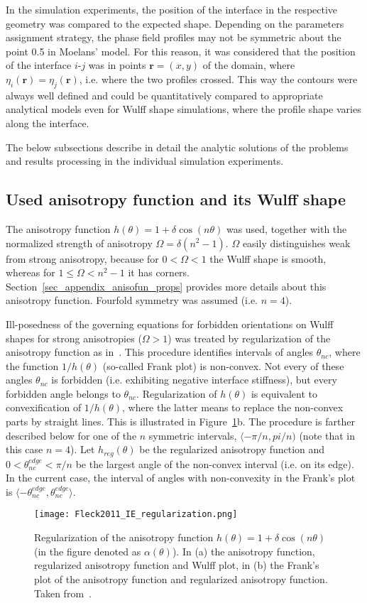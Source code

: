 In the simulation experiments, the position of the interface in the respective geometry was compared to the expected shape. Depending on the parameters assignment strategy, the phase field profiles may not be symmetric about the point 0.5 in Moelans' model. For this reason, it was considered that the position of the interface $i$-$j$ was in points $\bm{r}=(x,y)$ of the domain, where $\eta_i(\bm{r})=\eta_j(\bm{r})$, i.e. where the two profiles crossed. This way the contours were always well defined and could be quantitatively compared to appropriate analytical models even for Wulff shape simulations, where the profile shape varies along the interface.

The below subsections describe in detail the analytic solutions of the problems and results processing in the individual simulation experiments. 

\subsection{Used anisotropy function and its Wulff shape}
The anisotropy function $h(\theta)=1+\delta\cos(n\theta)$ was used, together with the normalized strength of anisotropy $\Omega=\delta(n^2-1)$. $\Omega$ easily distinguishes weak from strong anisotropy, because for $0<\Omega<1$ the Wulff shape is smooth, whereas for $1\leq\Omega<n^2-1$ it has corners. Section~\ref{sec_appendix_anisofun_props} provides more details about this anisotropy function. Fourfold symmetry was assumed (i.e. $n=4$).

Ill-posedness of the governing equations for forbidden orientations on Wulff shapes for strong anisotropies ($\Omega>1$) was treated by regularization of the anisotropy function as in~\cite{Eggleston2001}. This procedure identifies intervals of angles $\theta_{nc}$, where the function $1/h(\theta)$ (so-called Frank plot) is non-convex. Not every of these angles $\theta_{nc}$ is forbidden (i.e. exhibiting negative interface stiffness), but every forbidden angle belongs to $\theta_{nc}$. Regularization of $h(\theta)$ is equivalent to convexification of $1/h(\theta)$, where the latter means to replace the non-convex parts by straight lines. This is illustrated in Figure~\ref{fig_regularization_of_IE_Fleck2011}b. The procedure is farther described below for one of the $n$ symmetric intervals,  $ \langle -\pi/n,pi/n )$ (note that in this case $n=4$). Let $h_{reg}(\theta)$ be the regularized anisotropy function and $0<\theta_{nc}^{edge}<\pi/n$ be the largest angle of the non-convex interval (i.e. on its edge). In the current case, the interval of angles with non-convexity in the Frank's plot is $ \langle -\theta_{nc}^{edge},\theta_{nc}^{edge} \rangle$. 
\begin{figure}
	\centering
	\texttt{[image: Fleck2011\_IE\_regularization.png]}
	\caption[Regularization of anisotropy function]{Regularization of the anisotropy function $h(\theta)=1+\delta\cos(n\theta)$ (in the figure denoted as $\alpha(\theta)$). In (a) the anisotropy function, regularized anisotropy function and Wulff plot, in (b) the Frank's plot of the anisotropy function and regularized anisotropy function. Taken from~\cite{Fleck2011}.}
	\label{fig_regularization_of_IE_Fleck2011}
\end{figure}

